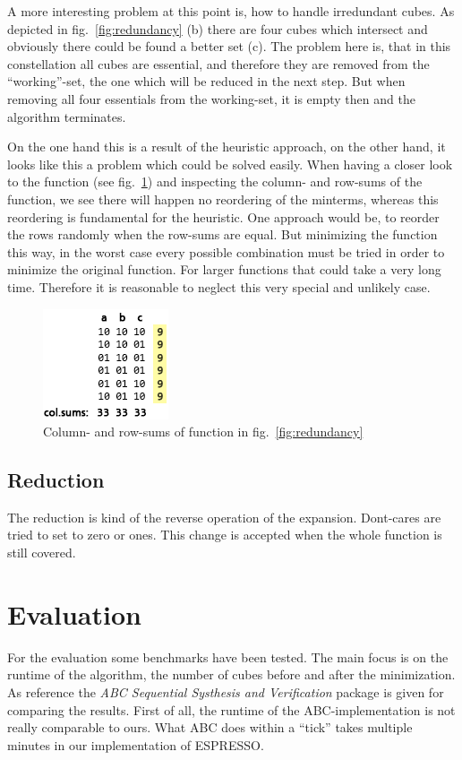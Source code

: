\documentclass[colorback,accentcolor=tud1c,11pt]{tudreport}
\begin{document}
 A more interesting problem at this point is, how to handle irredundant cubes. As depicted in fig.~\ref{fig:redundancy} (b) there are four cubes which intersect and obviously there could be found a better set (c). The problem here is, that in this constellation all cubes are essential, and therefore they are removed from the ``working''-set, the one which will be reduced in the next step. But when removing all four essentials from the working-set, it is empty then and the algorithm terminates.
 \par
 On the one hand this is a result of the heuristic approach, on the other hand, it looks like this a problem which could be solved easily. When having a closer look to the function (see fig.~\ref{fig:redundancy2}) and inspecting the column- and row-sums of the function, we see there will happen no reordering of the minterms, whereas this reordering is fundamental for the heuristic. One approach would be, to reorder the rows randomly when the row-sums are equal. But minimizing the function this way, in the worst case every possible combination must be tried in order to minimize the original function. For larger functions that could take a very long time. Therefore it is reasonable to neglect this very special and unlikely case.

 \begin{figure}
   \centering
   \includegraphics{redundancy2}
   \caption{Column- and row-sums of function in fig.~\ref{fig:redundancy}}
   \label{fig:redundancy2}
 \end{figure}

 \section{Reduction}
 The reduction is kind of the reverse operation of the expansion. Dont-cares are tried to set to zero or ones. This change is accepted when the whole function is still covered.

 \chapter{Evaluation}
 For the evaluation some benchmarks have been tested. The main focus is on the runtime of the algorithm, the number of cubes before and after the minimization. As reference the \textit{ABC Sequential Systhesis and Verification} package is given for comparing the results. First of all, the runtime of the ABC-implementation is not really comparable to ours. What ABC does within a ``tick'' takes multiple minutes in our implementation of ESPRESSO.
 \par
 
 

  
  
\end{document}
